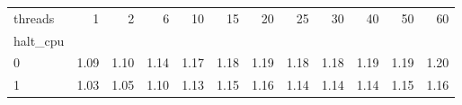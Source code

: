\begin{tabular}{lrrrrrrrrrrr}
\toprule
threads &    1  &    2  &    6  &    10 &    15 &    20 &    25 &    30 &    40 &    50 &    60 \\
halt\_cpu &       &       &       &       &       &       &       &       &       &       &       \\
\midrule
0        &  1.09 &  1.10 &  1.14 &  1.17 &  1.18 &  1.19 &  1.18 &  1.18 &  1.19 &  1.19 &  1.20 \\
1        &  1.03 &  1.05 &  1.10 &  1.13 &  1.15 &  1.16 &  1.14 &  1.14 &  1.14 &  1.15 &  1.16 \\
\bottomrule
\end{tabular}
